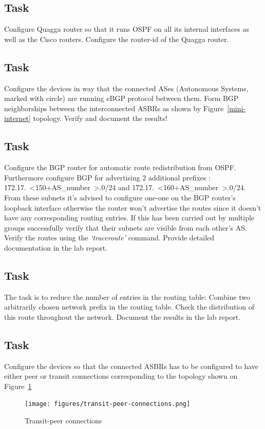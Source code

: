 \documentclass[a4paper]{article}
\begin{document}
\subsection{Task}
Configure Quagga router so that it runs OSPF on all its internal interfaces as well as the Cisco routers. Configure the
router-id of the Quagga router.
\subsection{Task}
Configure the devices in way that the connected ASes (Autonomous Systems, marked with circle) are running eBGP protocol
between them. Form BGP neighborships between the interconnected ASBRs as shown by Figure~\ref{mini-internet} topology.
Verify and document the results!
\subsection{Task}
Configure the BGP router for automatic route redistribution from OSPF. Furthermore configure BGP for advertising 2
additional prefixes : 172.17.~\textless150+AS\_number~\textgreater.0/24 and
172.17.~\textless160+AS\_number~\textgreater.0/24. From these subnets it's advised to configure one-one on the BGP
router's loopback interface otherwise the router won't advertise the routes since it doesn't have any corresponding
routing entries. If this has been carried out by multiple groups successfully verify that their subnets are visible
from each other's AS. Verify the routes using the \emph{`traceroute'} command. Provide detailed documentation in the lab
report.
\subsection{Task}
The task is to reduce the number of entries in the routing table: Combine two arbitrarily chosen network prefix in the
routing table. Check the distribution of this route throughout the network. Document the results in the lab report.
\subsection{Task}
Configure the devices so that the connected ASBRs has to be configured to have either peer or transit connections
corresponding to the topology shown on Figure~\ref{fig:transit-connections}
\begin{figure}[H]
    \centering
    \texttt{[image: figures/transit-peer-connections.png]}
    \caption{Transit-peer connections}
    \label{fig:transit-connections}
\end{figure}
\end{document}
